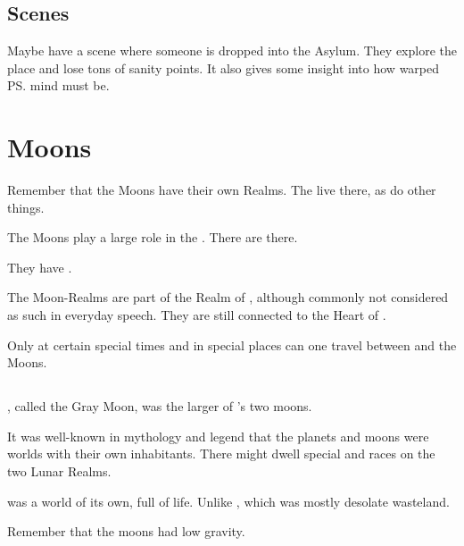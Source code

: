 \subsection{Scenes}
Maybe have a scene where someone is dropped into the Asylum. 
They explore the place and lose tons of sanity points. 
It also gives some insight into how warped \ps{\Ishnaruchaefir} mind must be. 

















\section{Moons}
Remember that the Moons have their own Realms. 
The \moonwolves{} live there, as do other things. 

The Moons play a large role in the \feud. There are \nexi{} there.

They have . 

The Moon-Realms are  part of the Realm of \Miith{}, although commonly not considered as such in everyday speech. 
They are still connected to the Heart of \Miith{}. 

Only at certain special times and in special places can one travel between \Azmith{} and the Moons. 







\subsection[Dun]{\Dun} 
\index{\Dun}
\Dun, called the Gray Moon, was the larger of \Miith{}'s two moons. 

It was well-known in mythology and legend that the planets and moons were worlds with their own inhabitants. 
There might dwell special \demihuman and \demiscatha races on the two Lunar Realms.

\Dun{} was a world of its own, full of life. 
Unlike , which was mostly desolate wasteland. 

Remember that the moons had low gravity. 





